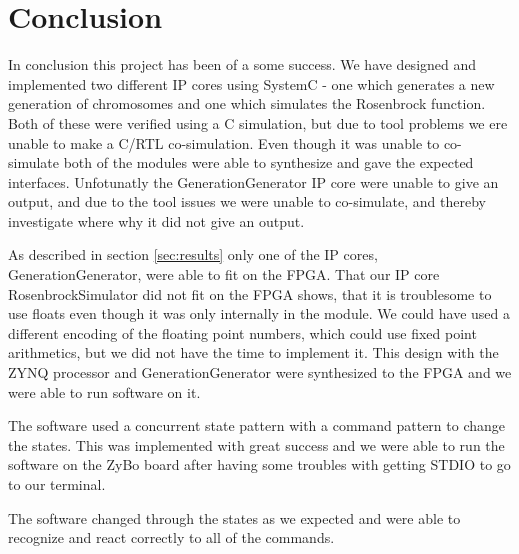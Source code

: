 \section{Conclusion}
In conclusion this project has been of a some success. We have designed and implemented two different IP cores using SystemC - one which generates a new generation of chromosomes and one which simulates the Rosenbrock function. Both of these were verified using a C simulation, but due to tool problems we ere unable to make a C/RTL co-simulation. Even though it was unable to co-simulate both of the modules were able to synthesize and gave the expected interfaces. Unfotunatly the GenerationGenerator IP core were unable to give an output, and due to the tool issues we were unable to co-simulate, and thereby investigate where why it did not give an output.

As described in section \ref{sec:results} only one of the IP cores, GenerationGenerator, were able to fit on the FPGA. That our IP core RosenbrockSimulator did not fit on the FPGA shows, that it is troublesome to use floats even though it was only internally in the module. We could have used a different encoding of the floating point numbers, which could use fixed point arithmetics, but we did not have the time to implement it.
This design with the ZYNQ processor and GenerationGenerator were synthesized to the FPGA and we were able to run software on it.

The software used a concurrent state pattern with a command pattern to change the states. This was implemented with great success and we were able to run the software on the ZyBo board after having some troubles with getting STDIO to go to our terminal.

The software changed through the states as we expected and were able to recognize and react correctly to all of the commands.



